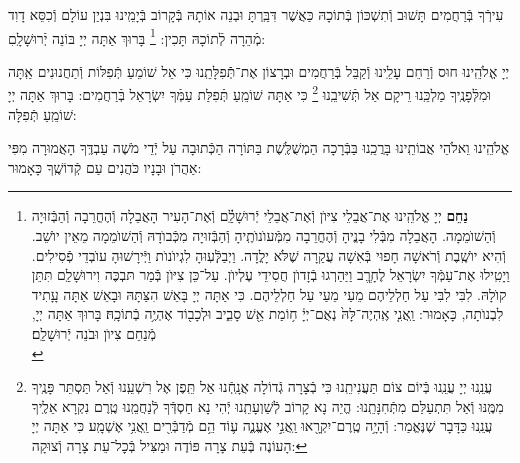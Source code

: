 \documentclass[twoside, openany, parskip=half, 11pt]{book}
\begin{document}
עִירְֿךָ בְּֿרַחֲמִים תָּשׁוּב וְֿתִשְׁכּוֹן בְּֿתוֹכָהּ כַּאֲשֶׁר דִּבַּֽרְתָּ וּבְנֵה אוֹתָהּ בְּֿקָרוֹב בְּֿיָמֵֽינוּ בִּנְיַן עוֹלָם וְֿכִסֵּא דָוִד מְֿהֵרָה לְֿתוֹכָהּ תָּכִין:
\footnote{
\textbf{נַחֵם}
יְיָ אֱלֹהֵֽינוּ אֶת־אֲבֵלֵי צִיּוֺן וְֿאֶת־אֲבֵלֵי יְֿרוּשָׁלַֽ֔֗͏ִם וְֿאֶת־הָעִיר הָאֲבֵלָה וְֿהֶחֳרֵבָה וְֿהַבְּֿזוּיָה וְֿהַשׁוֺמֵמָה. הָאֲבֵלָה מִבְּֿלִי בָנֱיהָ וְֿהֶחֳרֵבָה מִמְּֿעוֺנוֺתֶֽיהָ וְֿהַבְּֿזוּיָה מִכְּֿבוֺדָהּ וְֿהַשׁוֺמֵמָה מֵאֵין יוֺשֵׁב. וְֿהִיא יוֺשֶֽׁבֶת וְֿרֹאשָׁה חָפוּי בְּֿאִשָׁה עֲקַרָה שֶׁלֹּא יָלֳדָה. וַיְבַלְְּֿעֽוּהָ לִגְיוֺנוֺת וַיְּֿירָשׁוּהָ עוֺבְדֵי פְֿסִילִים. וַיָטִֽילוּ אֶת־עַמְּֿךָ יִשְׂרָאֵל לֶחָרֱֽב וַיַּהַרְגוּ בְֿזָדוֺן חֲסִידֵי עֶלְיוֺן. עַל־כֵּן צִיּוֺן בְּֿמַר תּבְכֶּה וִירוּשָׁלַֽ͏ִם תִּתֵּן קוֺלָהּ. לִבִּי לִבִּי עַל חַלְלֵיהֶם מֵעַי מֵעַי עַל חַלְלֵיהֶם. כִּי אַתָּה יְיָ בָּאֵשׁ הִצַּתָּהּ וּבָאֵשׁ אַתָּה עָָתִיד לִבְנוֺתָה, כָּאָמוּר: וַֽאֲנִ֤י אֶֽהְיֶה־לָּהּ֙ נְאֻם־יְיָ֔ ח֥וֹמַת אֵ֖שׁ סָבִ֑יב וּלְכָב֖וֹד אֶהְיֶ֥ה בְֿתוֹכָֽהּ׃
בָּרוּךְ אַתָּה יְיָ, מְֿנַחֵם צִיוֺן וּבֹנֵה יְֿרוּשָׁלַֽ͏ִם׃ \\
}
בָּרוּךְ אַתָּה יְיָ בּוֹנֵה יְֿרוּשָׁלָֽםִ:

\weekdaysamalchus

יְיָ אֱלֹהֵֽינוּ חוּס וְֿרַחֵם עָלֵֽינוּ וְֿקַבֵּל בְּֿרַחֲמִים וּבְרָצוֹן אֶת־תְּֿֿפִלָּתֵֽנוּ כִּי אֵל שׁוֹמֵעַ תְּֿפִלּוֹת וְֿתַחֲנוּנִים אַֽתָּה וּמִלְּֿפָנֶֽיךָ מַלְכֵּֽנוּ רֵיקָם אַל תְּֿשִׁיבֵֽנוּ
\footnote{
עֲנֵֽנוּ יְיָ עֲנֵֽנוּ בְּֿיוֹם צוֹם תַּעֲנִיתֵֽנוּ כִּי בְֿצָרָה גְֿדוֹלָה אֲנָֽחְֿנוּ אַל תֵּֽפֶן אֶל רִשְׁעֵֽנוּ וְֿאַל תַּסְתֵּר פָּנֶֽיךָ מִמֶּֽנּוּ וְֿאַל תִּתְעַלַּם מִתְּֿחִנָּתֵֽנוּ: הֱיֵה נָא קָרוֹב לְֿשַׁוְעָתֵֽנוּ יְֿהִי נָא חַסְדְּֿךָ לְֿנַחֲמֵֽנוּ טֶֽרֶם נִקְרָא אֵלֶֽיךָ עֲנֵֽנוּ כַּדָּבָר שֶׁנֶּאֱמַר:
וְֿהָיָ֥ה טֶֽרֶם־יִקְרָ֖אוּ וַֽאֲנִ֣י אֶעֱנֶ֑ה ע֛וֹד הֵ֥ם מְֿדַבְּֿרִ֖ים וַֽאֲנִ֥י אֶשְׁמָֽע׃ כִּי אַתָּה יְיָ הָעוֹנֶה בְּֿעֵת צָרָה פּוֹדֶה וּמַצִּיל בְּֿכׇל־עֵת צָרָה וְֿצוּקָה:
}
כִּי אַתָּה שׁוֹמֵֽעַ תְּֿפִלַּת עַמְּֿךָ יִשְׂרָאֵל בְּֿרַחֲמִים: בָּרוּךְ אַתָּה יְיָ שׁוֹמֵֽעַ תְּֿפִלָּה:

\retzeh

\yaalehveyavo

\zion

\modim

\alhanisim

\weekdaysahodos

אֱלֹהֵֽינוּ וֵאלֹהֵי אֲבוֹתֵֽינוּ בָּרֲכֵֽנוּ בַּבְּֿרָכָה הַמְשֻׁלֶּֽשֶׁת בַּתּוֹרָה
הַכְּֿתוּבָה עַל יְֿדֵי מֹשֶׁה עַבְדֶּֽךָ הָאֲמוּרָה מִפִּי אַהֲרֹן וּבָנָיו כֹּהֲנִים עַם קְֿדוֹשֶֽׁךָ כָּאָמוּר:
\end{document}
